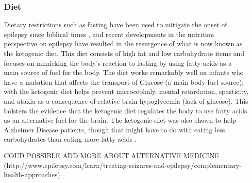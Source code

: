 \subsubsection{Diet}
Dietary restrictions such as fasting have been used to mitigate the onset of epilepsy since biblical times \cite{bailey2005use}, and recent developments in the nutrition perspective on epilepsy have resulted in the resurgence of what is now known as the ketogenic diet. This diet consists of high fat and low carbohydrate items and focuses on mimicking the body's reaction to fasting by using fatty acids as a main source of fuel for the body. The diet works remarkably well on infants who have a mutation that affects the transport of Glucose (a main body fuel source): with the ketogenic diet helps prevent microcephaly, mental retardation, spasticity, and ataxia as a consequence of relative brain hypoglycemia (lack of glucose). This bolsters the evidence that the ketogenic diet regulates the body to use fatty acids as an alternative fuel for the brain. The ketogenic diet was also shown to help Alzheimer Disease patients, though that might have to do with eating less carbohydrates than eating more fatty acids \cite{baranano2008ketogenic}.

COUD POSSIBLE ADD MORE ABOUT ALTERNATIVE MEDICINE (http://www.epilepsy.com/learn/treating-seizures-and-epilepsy/complementary-health-approaches)